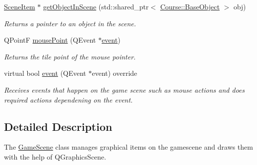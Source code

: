 \begin{DoxyCompactItemize}
\hyperlink{class_student_1_1_scene_item}{Scene\-Item} $\ast$ \hyperlink{class_student_1_1_game_scene_a76e1879837c2a65b08ed263091a941ed}{get\-Object\-In\-Scene} (std\-::shared\-\_\-ptr$<$ \hyperlink{class_course_1_1_base_object}{Course\-::\-Base\-Object} $>$ obj)
\begin{DoxyCompactList}\small\item\em Returns a pointer to an object in the scene. \end{DoxyCompactList}\item 
Q\-Point\-F \hyperlink{class_student_1_1_game_scene_aa62612b4e15beadfb9f2f7a8f0e84ffe}{mouse\-Point} (Q\-Event $\ast$\hyperlink{class_student_1_1_game_scene_a60a33d6cd4e3c40979e50b665d8cb024}{event})
\begin{DoxyCompactList}\small\item\em Returns the tile point of the mouse pointer. \end{DoxyCompactList}\item 
virtual bool \hyperlink{class_student_1_1_game_scene_a60a33d6cd4e3c40979e50b665d8cb024}{event} (Q\-Event $\ast$event) override
\begin{DoxyCompactList}\small\item\em Receives events that happen on the game scene such as mouse actions and does required actions dependening on the event. \end{DoxyCompactList}\end{DoxyCompactItemize}


\subsection{Detailed Description}
The \hyperlink{class_student_1_1_game_scene}{Game\-Scene} class manages graphical items on the gamescene and draws them with the help of Q\-Graphics\-Scene. 

